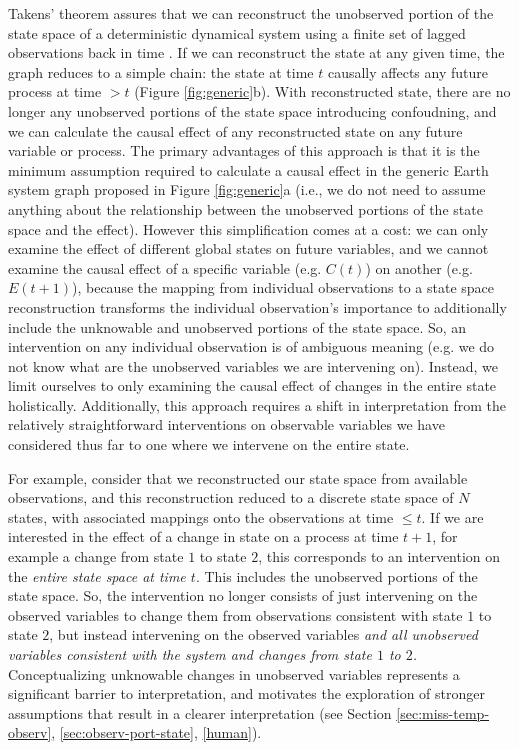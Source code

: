 \documentclass[12pt]{article}
\begin{document}
Takens' theorem assures that we can reconstruct the unobserved portion
of the state space of a deterministic dynamical system using a finite
set of lagged observations back in time
\citep{takens1981detecting,deyle2011generalized,Sugihara496}. If we
can reconstruct the state at any given time, the graph reduces to a
simple chain: the state at time $t$ causally affects any future
process at time $> t$ (Figure \ref{fig:generic}b). With reconstructed
state, there are no longer any unobserved portions of the state space
introducing confoudning, and we can calculate the causal effect of any
reconstructed state on any future variable or process. The primary
advantages of this approach is that it is the minimum assumption
required to calculate a causal effect in the generic Earth system
graph proposed in Figure \ref{fig:generic}a (i.e., we do not need to
assume anything about the relationship between the unobserved portions
of the state space and the effect). However this simplification comes
at a cost: we can only examine the effect of different global states
on future variables, and we cannot examine the causal effect of a
specific variable (e.g. $C(t)$) on another (e.g. $E(t+1)$), because
the mapping from individual observations to a state space
reconstruction transforms the individual observation's importance to
additionally include the unknowable and unobserved portions of the
state space. So, an intervention on any individual observation is of
ambiguous meaning (e.g. we do not know what are the unobserved
variables we are intervening on). Instead, we limit ourselves to only
examining the causal effect of changes in the entire state
holistically. Additionally, this approach requires a shift in
interpretation from the relatively straightforward interventions on
observable variables we have considered thus far to one where we
intervene on the entire state.

For example, consider that we reconstructed our state space from
available observations, and this reconstruction reduced to a discrete
state space of $N$ states, with associated mappings onto the
observations at time $\leq t$. If we are interested in the effect of a
change in state on a process at time $t+1$, for example a change from
state $1$ to state $2$, this corresponds to an intervention on the
\textit{entire state space at time $t$}. This includes the unobserved
portions of the state space. So, the intervention no longer consists
of just intervening on the observed variables to change them from
observations consistent with state $1$ to state $2$, but instead
intervening on the observed variables \emph{and all unobserved
  variables consistent with the system and changes from state $1$ to
  $2$.}  Conceptualizing unknowable changes in unobserved variables
represents a significant barrier to interpretation, and motivates the
exploration of stronger assumptions that result in a clearer
interpretation (see Section \ref{sec:miss-temp-observ},
\ref{sec:observ-port-state}, \ref{human}).
\end{document}
